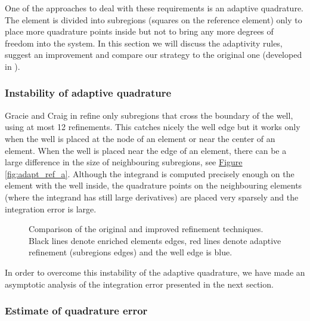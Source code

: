 \documentclass[FM,Dis]{tulthesis}
\newcommand{\fig}[1]{\hyperref[#1]{Figure \ref{#1}}}
\newcommand{\figpath}{figures/}
\begin{document}
One of the approaches to deal with these requirements is an adaptive quadrature. The element is divided into 
subregions (squares on the reference element) only to place more quadrature points inside but not to bring 
any more degrees of freedom into the system. In this section we will discuss the adaptivity rules, 
suggest an improvement and compare our strategy to the original one (developed in \cite{gracie_modelling_2010}).

\subsubsection{Instability of adaptive quadrature}
\label{sec:refinement_element}
Gracie and Craig in \cite{gracie_modelling_2010} refine only subregions that cross the boundary of the well, using at most 12 refinements.
This catches nicely the well edge but it works only when the well is placed at the node of an element or near the center of an element. 
When the well is placed near the edge of an element, there can be
a large difference in the size of neighbouring subregions, see \fig{fig:adapt_ref_a}. Although
the integrand is computed precisely enough on the element with the well inside, the quadrature points on the
neighbouring elements (where the integrand has still large derivatives) are placed very sparsely 
and the integration error is large.

\begin{figure}[!htb]
  \centering    
  \hspace{0pt}
  \caption[Adaptive refinement comparison]
  {Comparison of the original and improved refinement techniques.
   Black lines denote enriched elements edges, red lines denote adaptive refinement (subregions edges) and the well
   edge is blue.
  }
  \label{fig:adapt_refinement}
\end{figure}
In order to overcome this instability of the adaptive quadrature, we have made an asymptotic analysis of the integration error presented 
in the next section.

\subsubsection{Estimate of quadrature error}
\end{document}
